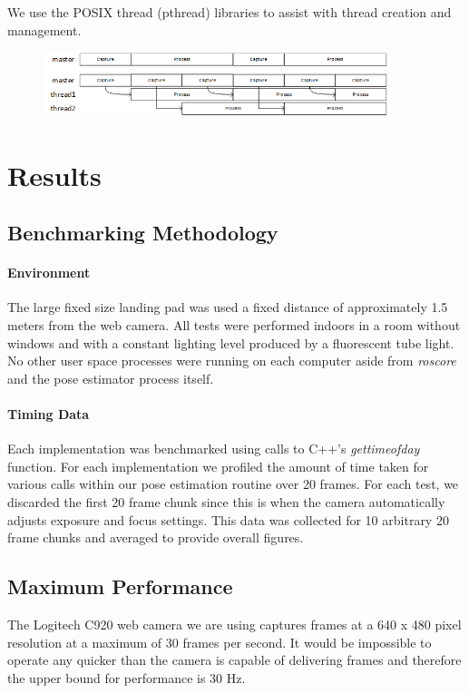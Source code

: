 \documentclass{acm_proc_article-sp}
\begin{document}
We use the POSIX thread (pthread) libraries to assist with thread creation and management.

\begin{figure}[tb]
    \centering
    \includegraphics[width=0.9\textwidth]{images/pipelining.png}
    \caption{}
    \label{fig:pipelining}
\end{figure}


\section{Results\label{sec:results}}

\subsection{Benchmarking Methodology \label{sec:benchmarking}}
\paragraph{Environment} The large fixed size landing pad was used a fixed distance of approximately 1.5 meters from the web camera. All tests were performed indoors in a room without windows and with a constant lighting level produced by a fluorescent tube light. No other user space processes were running on each computer aside from \textit{roscore} and the pose estimator process itself. 

\paragraph{Timing Data} Each implementation was benchmarked using calls to C++'s \textit{gettimeofday} function. For each implementation we profiled the amount of time taken for various calls within our pose estimation routine over 20 frames. For each test, we discarded the first 20 frame chunk since this is when the camera automatically adjusts exposure and focus settings. This data was collected for 10 arbitrary 20 frame chunks and averaged to provide overall figures.

\subsection{Maximum Performance}
The Logitech C920 web camera we are using captures frames at a 640 x 480 pixel resolution at a maximum of 30 frames per second. It would be impossible to operate any quicker than the camera is capable of delivering frames and therefore the upper bound for performance is 30 Hz.
\end{document}

